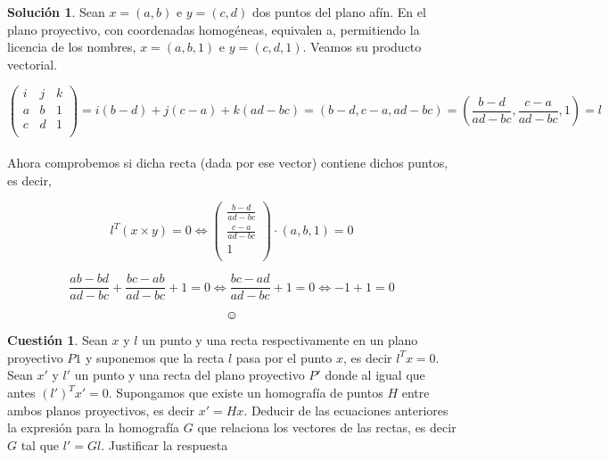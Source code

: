 \documentclass[a4paper, 11pt]{article}
\theoremstyle{definition}
\newtheorem{cuestion}{Cuestión}
\newtheorem*{solucion}{Solución}
\begin{document}
  \begin{solucion}
      Sean $x=(a,b)$ e $y=(c,d)$ dos puntos del plano afín. En el plano proyectivo,
      con coordenadas homogéneas, equivalen a, permitiendo la licencia de los nombres,
      $x=(a,b,1)$ e $y=(c,d,1)$. Veamos su producto vectorial.

      \[
      \left(
      \begin{array}{ccc}
          i & j & k \\
          a & b & 1 \\
          c & d & 1 \\
      \end{array}
      \right) = i(b-d) + j(c-a) + k(ad-bc) = (b-d,c-a,ad-bc) = (\frac{b-d}{ad-bc},\frac{c-a}{ad-bc},1) = l
      \] \\

      Ahora comprobemos si dicha recta (dada por ese vector) contiene dichos puntos, es decir,

      \[
        l^T (x \times y) = 0 \Leftrightarrow \left(\begin{array}{ccc}
                                                  \frac{b-d}{ad-bc} \\
                                                  \frac{c-a}{ad-bc} \\
                                                  1 \\
                                                \end{array}\right) \cdot (a,b,1) = 0
      \]

      \[
        \frac{ab -bd}{ad-bc} + \frac{bc-ab}{ad-bc} + 1 = 0 \Leftrightarrow \frac{bc-ad}{ad-bc} + 1 = 0 \Leftrightarrow -1 + 1 = 0
      \]

      $$ \smiley$$


  \end{solucion}

  \begin{cuestion}
    Sean $x$ y $l$ un punto y una recta respectivamente en un plano proyectivo $P1$
    y suponemos que la recta $l$ pasa por el punto $x$, es decir $l^Tx=0$. Sean $x'$ y $l'$
    un punto y una recta del plano proyectivo $P'$ donde al igual que antes $(l')^T x'=0$.
    Supongamos que existe un homografía de puntos $H$ entre ambos planos proyectivos,
    es decir $x'=Hx$. Deducir de las ecuaciones anteriores la expresión para la
    homografía $G$ que relaciona los vectores de las rectas, es decir $G$ tal que $l'=Gl$.
    Justificar la respuesta

  \end{cuestion}
\end{document}
